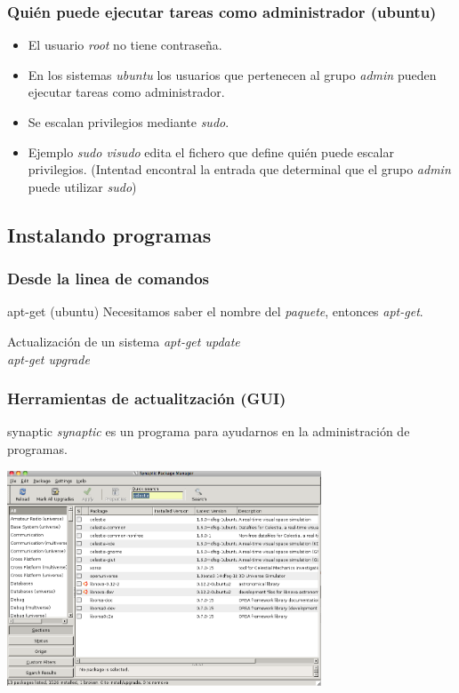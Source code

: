 \documentclass[colorlinks,10pt]{beamer}
\begin{document}
\begin{frame}
  \frametitle{Quién puede ejecutar tareas como administrador (ubuntu)}
  \begin{itemize}
  \item<+-> El usuario \emph{root} no tiene contraseña.
  \item<+-> En los sistemas \emph{ubuntu} los usuarios que pertenecen al grupo  \emph{admin} pueden ejecutar tareas como  administrador.
  \item<+-> Se escalan privilegios mediante \emph{sudo}.
  \item<+-> Ejemplo \emph{sudo visudo } edita el fichero que define
    quién puede escalar privilegios. (Intentad encontral la entrada que determinal que el grupo \emph{admin} puede utilizar \emph{sudo})
  \end{itemize}
\end{frame}


\subsection{Instalando programas}

\begin{frame}
  \frametitle{Desde la linea de comandos}
  \begin{block}{apt-get (ubuntu)}
    Necesitamos saber el nombre del \emph{paquete}, entonces 
     \emph{apt-get}.
  \end{block}
\pause  \begin{block}{Actualización de un sistema}
  \emph{apt-get update}\\
  \emph{apt-get upgrade}
  \end{block}
\end{frame}




\begin{frame}
  \frametitle{Herramientas de actualitzación (GUI)}
  \begin{block}{synaptic}
    \emph{synaptic} es un programa para ayudarnos en la administración de programas. 
  \end{block}

 \begin{center}
    \includegraphics[width=0.7\textwidth]{figs/synaptic} 
  \end{center} 
\end{frame}
\end{document}
